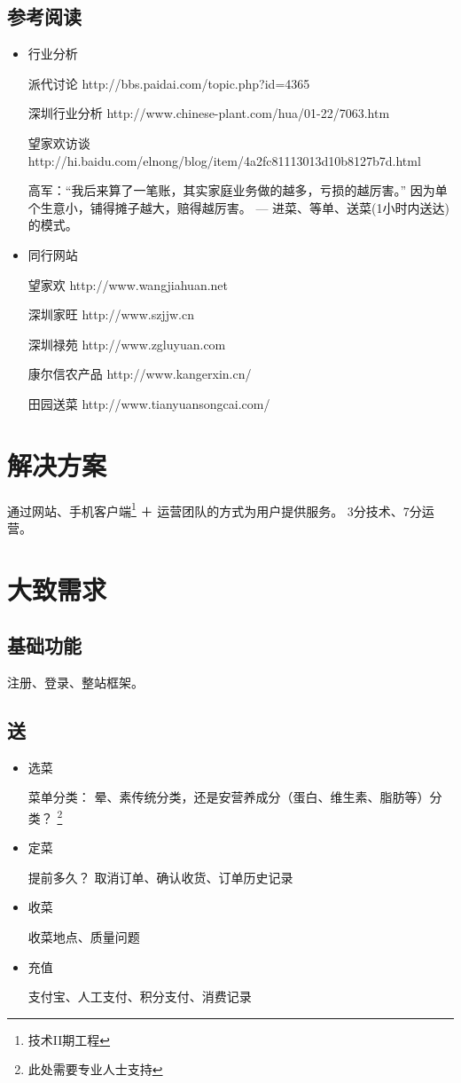 \documentclass[a4paper,12pt]{article}
\begin{document}
  \subsection{参考阅读}
  \begin{itemize}
  \item 行业分析

    派代讨论 http://bbs.paidai.com/topic.php?id=4365

    深圳行业分析 http://www.chinese-plant.com/hua/01-22/7063.htm

    望家欢访谈 http://hi.baidu.com/elnong/blog/item/4a2fc81113013d10b8127b7d.html

    高军：“我后来算了一笔账，其实家庭业务做的越多，亏损的越厉害。” 因为单个生意小，铺得摊子越大，赔得越厉害。 --- 进菜、等单、送菜(1小时内送达)的模式。

  \item 同行网站

    望家欢 http://www.wangjiahuan.net

    深圳家旺 http://www.szjjw.cn

    深圳禄苑 http://www.zgluyuan.com

    康尔信农产品 http://www.kangerxin.cn/

    田园送菜 http://www.tianyuansongcai.com/
  \end{itemize}

  
  \section{解决方案}
  通过网站、手机客户端\footnote{技术II期工程} ＋ 运营团队的方式为用户提供服务。 3分技术、7分运营。
  

  \section{大致需求}
  
  \subsection{基础功能}
  注册、登录、整站框架。
  
  \subsection{送}
  \begin{itemize}
  \item 选菜

    菜单分类： 晕、素传统分类，还是安营养成分（蛋白、维生素、脂肪等）分类？ \footnote{此处需要专业人士支持}
  \item 定菜

    提前多久？ 取消订单、确认收货、订单历史记录
  \item 收菜

    收菜地点、质量问题
  \item 充值
    
    支付宝、人工支付、积分支付、消费记录
  \end{itemize}
\end{document}
